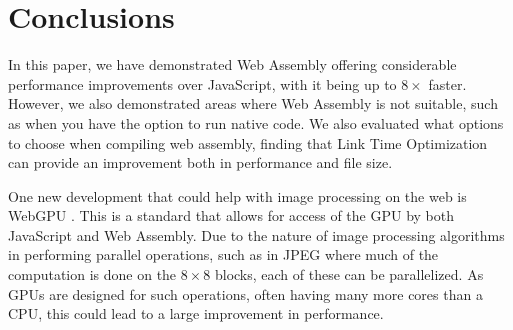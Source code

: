\documentclass[12pt,a4paper]{article}
\begin{document}
\section{Conclusions}

In this paper, we have demonstrated Web Assembly offering considerable performance improvements over JavaScript, with it being up to $8\times$ faster. However, we also demonstrated areas where Web Assembly is not suitable, such as when you have the option to run native code. We also evaluated what options to choose when compiling web assembly, finding that Link Time Optimization can provide an improvement both in performance and file size.

One new development that could help with image processing on the web is WebGPU \cite{webgpu}. This is a standard that allows for access of the GPU by both JavaScript and Web Assembly. Due to the nature of image processing algorithms in performing parallel operations, such as in JPEG where much of the computation is done on the $8\times 8$ blocks, each of these can be parallelized. As GPUs are designed for such operations, often having many more cores than a CPU, this could lead to a large improvement in performance.



\newpage

\end{document}
